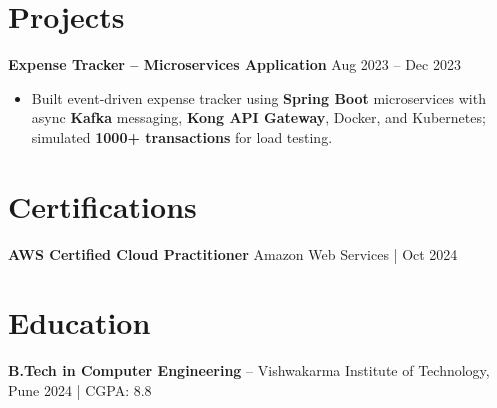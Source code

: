 \documentclass[letterpaper,10pt]{article}
\begin{document}
\section*{Projects}

\textbf{Expense Tracker -- Microservices Application} \hfill Aug 2023 -- Dec 2023
\begin{itemize}[leftmargin=*]
    \item Built event-driven expense tracker using \textbf{Spring Boot} microservices with async \textbf{Kafka} messaging, \textbf{Kong API Gateway}, Docker, and Kubernetes; simulated \textbf{1000+ transactions} for load testing.
\end{itemize}

\section*{Certifications}
\textbf{AWS Certified Cloud Practitioner} \hfill Amazon Web Services \;|\; Oct 2024

\section*{Education}
\textbf{B.Tech in Computer Engineering} -- Vishwakarma Institute of Technology, Pune \hfill 2024 \;|\; CGPA: 8.8
\end{document}
